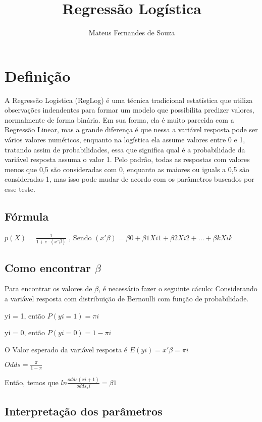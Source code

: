 \documentclass{article}
\title{Regressão Logística}
\author{Mateus Fernandes de Souza}
\begin{document}
\maketitle

\section{Definição}
A Regressão Logística (RegLog) é uma técnica tradicional estatística que utiliza observações indendentes para formar um modelo que possibilita predizer valores, normalmente de forma binária.
Em sua forma, ela é muito parecida com a Regressão Linear, mas a grande diferença é que nessa a variável resposta pode ser vários valores numéricos, enquanto na logística ela assume valores entre 0 e 1, tratando assim de probabilidades, essa que significa qual é a probabilidade da variável resposta assuma o valor 1. Pelo padrão, todas as respostas com valores menos que 0,5 são consideradas com 0, enquanto as maiores ou iguals a 0,5 são consideradas 1, mas isso pode mudar de acordo com os parâmetros buscados por esse teste.

\subsection{Fórmula}
$p(X) = \frac{1}{1+e^-{(x'\beta)}}$
, Sendo ${(x'\beta)} = \beta0 + \beta1Xi1 + \beta2Xi2 + ... + \beta kXik $

\subsection{Como encontrar $\beta$}

Para encontrar os valores de $\beta$, é necessário fazer o seguinte cáculo:
Considerando a variável resposta com distribuição de Bernoulli com função de probabilidade.

yi = 1, então $P(yi = 1) = \pi i$

yi = 0, então $P(yi = 0) = 1 - \pi i$

O Valor esperado da variável resposta é $E(yi) = x'\beta = \pi i$

$Odds = \frac{\pi}{1-\pi}$

Então, temos que $ln \frac{odds(xi + 1)}{odds_xi} = \beta1$

\subsection{Interpretação dos parâmetros}
\end{document}
